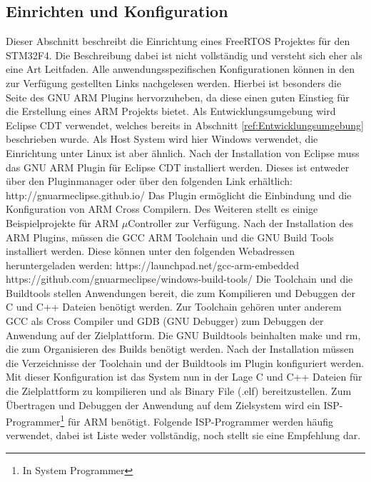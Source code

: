\subsection{Einrichten und Konfiguration}
\label{sec:Einrichtung und Konfiguration}
Dieser Abschnitt beschreibt die Einrichtung eines FreeRTOS Projektes für den STM32F4. Die Beschreibung dabei ist nicht vollständig und versteht sich eher als eine Art Leitfaden. Alle anwendungsspezifischen Konfigurationen können in den zur Verfügung gestellten Links nachgelesen werden. Hierbei ist besonders die Seite des GNU ARM Plugins hervorzuheben, da diese einen guten Einstieg für die Erstellung eines ARM Projekts bietet. Als Entwicklungsumgebung wird Eclipse CDT verwendet, welches bereits in Abschnitt \ref{ref:Entwicklungsumgebung} beschrieben wurde. Als Host System wird hier Windows verwendet, die Einrichtung unter Linux ist aber ähnlich. Nach der Installation von Eclipse muss das GNU ARM Plugin für Eclipse CDT installiert werden. Dieses ist entweder über den Pluginmanager oder über den folgenden Link erhältlich: 
\newline
\newline
http://gnuarmeclipse.github.io/
\newline
\newline
Das Plugin ermöglicht die Einbindung und die Konfiguration von ARM Cross Compilern. Des Weiteren stellt es einige Beispielprojekte für ARM $\mu$Controller zur Verfügung. Nach der Installation des ARM Plugins, müssen die GCC ARM Toolchain und die GNU Build Tools installiert werden. 
Diese können unter den folgenden Webadressen heruntergeladen werden: 
\newline
\newline
https://launchpad.net/gcc-arm-embedded
\newline
https://github.com/gnuarmeclipse/windows-build-tools/
\newline
\newline
Die Toolchain und die Buildtools stellen Anwendungen bereit, die zum Kompilieren und Debuggen der C und C++ Dateien benötigt werden. Zur Toolchain gehören unter anderem GCC als Cross Compiler und GDB (GNU Debugger) zum Debuggen der Anwendung auf der Zielplattform. Die GNU Buildtools beinhalten make und rm, die zum Organisieren des Builds benötigt werden. Nach der Installation müssen die Verzeichnisse der Toolchain und der Buildtools im Plugin konfiguriert werden. Mit dieser Konfiguration ist das System nun in der Lage C und C++ Dateien für die Zielplattform zu kompilieren und als Binary File (.elf) bereitzustellen. Zum Übertragen und Debuggen der Anwendung auf dem Zielsystem wird ein ISP-Programmer\footnote{In System Programmer} für ARM benötigt. Folgende ISP-Programmer werden häu\-fig verwendet, dabei ist Liste weder vollständig, noch stellt sie eine Empfehlung dar.
